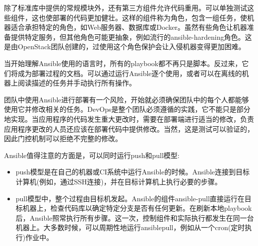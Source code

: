 
除了标准库中提供的常规模块外，还有第三方组件允许代码重用。可以单独测试这些组件，这也使部署的代码更加健壮。这样的组件称为角色，包含一组任务，使机器适合承担特定的角色，如Web服务器、数据库或Docker。虽然有些角色让机器准备提供特定服务，但其他角色可能更抽象，例如流行的ansible-hardening角色。这是由OpenStack团队创建的，过使用这个角色保护会让入侵机器变得更加困难。

当开始理解Ansible使用的语言时，所有的playbook都不再只是脚本。反过来，它们将成为部署过程的文档。可以通过运行Ansible逐个使用，或者可以在离线的机器上阅读描述的任务并手动执行所有操作。

团队中使用Ansible进行部署有一个风险，开始就必须确保团队中的每个人都能够使用它并修改相关的任务。DevOps是整个团队必须遵循的实践，它不能只是部分地实现。当应用程序的代码发生重大更改时，需要在部署端进行适当的修改，负责应用程序更改的人员还应该在部署代码中提供修改。当然，这是测试可以验证的，因此门控机制可以拒绝不完整的修改。 

Ansible值得注意的方面是，可以同时运行push和pull模型:

\begin{itemize}
\item 
push模型是在自己的机器或CI系统中运行Ansible的时候。Ansible连接到目标计算机(例如，通过SSH连接)，并在目标计算机上执行必要的步骤。

\item 
pull模型中，整个过程由目标机发起。Ansible的组件ansible-pull直接运行在目标机器上，检查代码库以确定特定分支是否有任何更新。在刷新本地playbook后，Ansible照常执行所有步骤。这一次，控制组件和实际执行都发生在同一台机器上。大多数时候，可以周期性地运行ansiblepull，例如从一个cron(定时执行)作业中。
\end{itemize}















